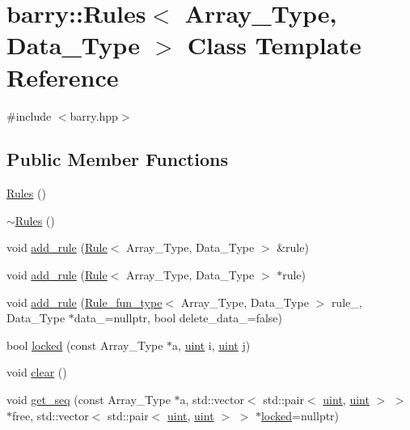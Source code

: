 \hypertarget{classbarry_1_1_rules}{}\section{barry\+:\+:Rules$<$ Array\+\_\+\+Type, Data\+\_\+\+Type $>$ Class Template Reference}
\label{classbarry_1_1_rules}


{\ttfamily \#include $<$barry.\+hpp$>$}

\subsection*{Public Member Functions}
\begin{DoxyCompactItemize}
\item 
\hyperlink{classbarry_1_1_rules_ac9468cdfab55a3be6675ad1fddae2bc0}{Rules} ()
\item 
\hyperlink{classbarry_1_1_rules_a287ba2cf76f83ad982c05383b5726946}{$\sim$\+Rules} ()
\item 
void \hyperlink{classbarry_1_1_rules_a60583152fddcb11178dcf3d02a924d7c}{add\+\_\+rule} (\hyperlink{classbarry_1_1_rule}{Rule}$<$ Array\+\_\+\+Type, Data\+\_\+\+Type $>$ \&rule)
\item 
void \hyperlink{classbarry_1_1_rules_abd60b1d381ad0c8a772e4d81264bbe0a}{add\+\_\+rule} (\hyperlink{classbarry_1_1_rule}{Rule}$<$ Array\+\_\+\+Type, Data\+\_\+\+Type $>$ $\ast$rule)
\item 
void \hyperlink{classbarry_1_1_rules_abbc63747014445b538384bb500464bb5}{add\+\_\+rule} (\hyperlink{namespacebarry_aefd7e6d4ba228e2ce1074d075c512178}{Rule\+\_\+fun\+\_\+type}$<$ Array\+\_\+\+Type, Data\+\_\+\+Type $>$ rule\+\_\+, Data\+\_\+\+Type $\ast$data\+\_\+=nullptr, bool delete\+\_\+data\+\_\+=false)
\item 
bool \hyperlink{classbarry_1_1_rules_a4e08a6b3d8b536cb1717c62192a91537}{locked} (const Array\+\_\+\+Type $\ast$a, \hyperlink{namespacebarry_a11dfc53ddb4672278319aa04f1e09a6c}{uint} i, \hyperlink{namespacebarry_a11dfc53ddb4672278319aa04f1e09a6c}{uint} j)
\item 
void \hyperlink{classbarry_1_1_rules_a135a15d3ff70d4350d76a15f8e85f7df}{clear} ()
\item 
void \hyperlink{classbarry_1_1_rules_a7b8f29955ec52f49808d7ea1cd4eaf5e}{get\+\_\+seq} (const Array\+\_\+\+Type $\ast$a, std\+::vector$<$ std\+::pair$<$ \hyperlink{namespacebarry_a11dfc53ddb4672278319aa04f1e09a6c}{uint}, \hyperlink{namespacebarry_a11dfc53ddb4672278319aa04f1e09a6c}{uint} $>$ $>$ $\ast$free, std\+::vector$<$ std\+::pair$<$ \hyperlink{namespacebarry_a11dfc53ddb4672278319aa04f1e09a6c}{uint}, \hyperlink{namespacebarry_a11dfc53ddb4672278319aa04f1e09a6c}{uint} $>$ $>$ $\ast$\hyperlink{classbarry_1_1_rules_a4e08a6b3d8b536cb1717c62192a91537}{locked}=nullptr)
\end{DoxyCompactItemize}


